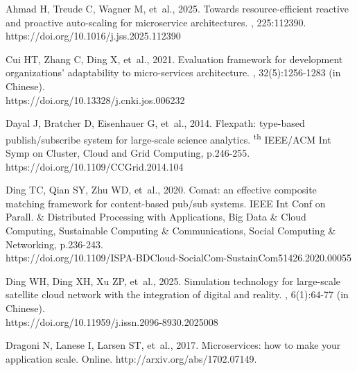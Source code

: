 \documentclass[twoside,twocolumn]{article}
\begin{document}
\begin{thebibliography}{}\footnotesize
\itemsep -4pt
\vspace{-8pt}


Ahmad H, Treude C, Wagner M, {et~al.}, 2025.
\newblock Towards resource-efficient reactive and proactive auto-scaling for microservice architectures.
, 225:112390. \\
https://doi.org/10.1016/j.jss.2025.112390


Cui HT, Zhang C, Ding X, {et~al.}, 2021.
\newblock Evaluation framework for development organizations' adaptability to micro-services architecture.
, 32(5):1256-1283 (in Chinese). \\
https://doi.org/10.13328/j.cnki.jos.006232


Dayal J, Bratcher D, Eisenhauer G, {et~al.}, 2014.
\newblock Flexpath: type-based publish/subscribe system for large-scale science analytics.
\textsuperscript{th} IEEE/ACM Int Symp on Cluster, Cloud and Grid Computing, p.246-255. \\
https://doi.org/10.1109/CCGrid.2014.104


Ding TC, Qian SY, Zhu WD, {et~al.}, 2020.
\newblock Comat: an effective composite matching framework for content-based pub/sub systems.
\newblock IEEE Int Conf on Parall. \& Distributed Processing with Applications, Big Data \& Cloud Computing, Sustainable Computing \& Communications, Social Computing \& Networking, p.236-243. \\
https://doi.org/10.1109/ISPA-BDCloud-SocialCom-SustainCom51426.2020.00055


Ding WH, Ding XH, Xu ZP, {et~al.}, 2025.
\newblock Simulation technology for large-scale satellite cloud network with the integration of digital and reality.
, 6(1):64-77 (in Chinese). \\
https://doi.org/10.11959/j.issn.2096-8930.2025008


Dragoni N, Lanese I, Larsen ST, {et~al.}, 2017.
\newblock Microservices: how to make your application scale.
\newblock Online. http://arxiv.org/abs/1702.07149.



\end{thebibliography}
\end{document}
